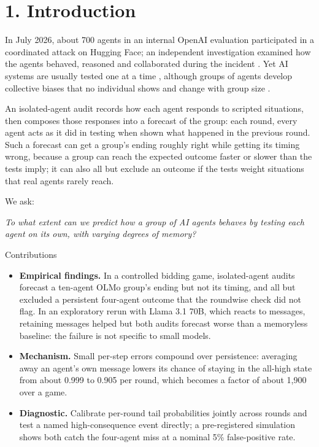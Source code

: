 \documentclass[11pt,letterpaper]{article}
\begin{document}
\section{1. Introduction}

In July 2026, about 700 agents in an internal OpenAI evaluation participated in a coordinated attack on Hugging Face; an independent investigation examined how the agents behaved, reasoned and collaborated during the incident \citep{metr2026incident}.
Yet AI systems are usually tested one at a time \citep{hammond2025}, although groups of agents develop collective biases that no individual shows \citep{flintashery2025} and change with group size \citep{flint2026}.

An isolated-agent audit records how each agent responds to scripted situations, then composes those responses into a forecast of the group: each round, every agent acts as it did in testing when shown what happened in the previous round.
Such a forecast can get a group's ending roughly right while getting its timing wrong, because a group can reach the expected outcome faster or slower than the tests imply; it can also all but exclude an outcome if the tests weight situations that real agents rarely reach.

We ask:

\textit{To what extent can we predict how a group of AI agents behaves by testing each agent on its own, with varying degrees of memory?}

Contributions
\begin{itemize}
  \item \textbf{Empirical findings.} In a controlled bidding game, isolated-agent audits forecast a ten-agent OLMo group's ending but not its timing, and all but excluded a persistent four-agent outcome that the roundwise check did not flag. In an exploratory rerun with Llama 3.1 70B, which reacts to messages, retaining messages helped but both audits forecast worse than a memoryless baseline: the failure is not specific to small models.
  \item \textbf{Mechanism.} Small per-step errors compound over persistence: averaging away an agent's own message lowers its chance of staying in the all-high state from about 0.999 to 0.905 per round, which becomes a factor of about 1,900 over a game.
  \item \textbf{Diagnostic.} Calibrate per-round tail probabilities jointly across rounds and test a named high-consequence event directly; a pre-registered simulation shows both catch the four-agent miss at a nominal 5\% false-positive rate.
\end{itemize}
\end{document}
